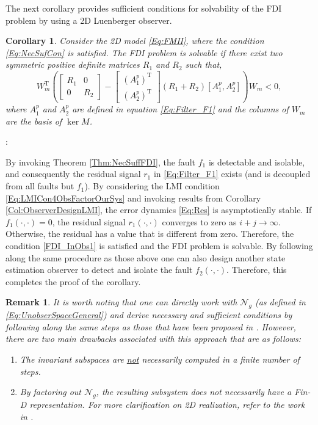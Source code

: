 \documentclass[journal,12pt,draftcls,onecolumn]{IEEEtran}
\newcommand{\tran}{\mathrm{T}}
\newcommand{\bbm}{\begin{bmatrix}}
\newcommand{\ebm}{\end{bmatrix}}
\newcommand{\ssp}[1]{\mathscr{#1}}      \newcommand{\setssp}[1]{\mathfrak{#1}}   \newcommand{\fld}[1]{\mathbb{#1}}       \newcommand{\op}[1]{\mathcal{#1}}       \newcommand{\sumbanach}[1]{\sum{#1}}
\def\QEDclosed{\hfill\IEEEQEDclosed}
\renewcommand{\qed}{\QEDclosed}
\renewenvironment{proof}[1][\proofname]{\noindent\nobreakspace{\bfseries #1}:\;}{\qed\par}
\newtheorem{corollary}{Corollary}
\newtheorem{remark}{Remark}
\begin{document}
The next corollary provides sufficient conditions for solvability of the FDI problem by using a 2D Luenberger observer.
\begin{corollary}\label{Col:FDI_LMI_Suff}
	Consider  the 2D model \eqref{Eq:FMII}, where the condition \eqref{Eq:NecSufCon} is satisfied. The FDI problem is solvable if there exist two symmetric  positive definite matrices $R_1$ and $R_2$ such that,
	\begin{equation}\label{Eq:LMICon4ObsFactorOurSys}
		W_m^\tran (\bbm R_1 &0\\ 0 &R_2\ebm - \bbm (A_1^p)^\tran\\(A_2^p)^\tran\ebm (R_1+R_2)[A_1^p,A_2^p])W_m<0,
	\end{equation}
	where $A_1^p$ and $A_2^p$ are defined in equation \eqref{Eq:Filter_F1} and the columns of $W_m$ are the basis of $\ker M$.
\end{corollary}
\begin{proof}
	
	By invoking Theorem \ref{Thm:NecSuffFDI}, the fault $f_1$ is detectable and isolable, and consequently the residual signal $r_1$ in \eqref{Eq:Filter_F1} exists (and is decoupled from all faults but $f_1$). By considering the LMI condition \eqref{Eq:LMICon4ObsFactorOurSys} and invoking results from Corollary \ref{Col:ObserverDesignLMI}, the error dynamics \eqref{Eq:Res} is asymptotically stable. If $f_1(\cdot,\cdot)=0$, the residual signal $r_1(\cdot,\cdot)$ converges to zero as $i+j\rightarrow\infty$. Otherwise, the residual has a value that is different from zero. Therefore, the condition \eqref{FDI_InObs1} is satisfied and the FDI problem is solvable. By following along the same procedure as those above one can also design another state estimation observer to detect and isolate the fault $f_2(\cdot,\cdot)$. Therefore, this completes the proof of the corollary.
\end{proof}
\begin{remark}\label{Rem:InfFactor}
	It is worth noting that one can directly work with $\ssp{N}_g$ (as defined in \eqref{Eq:UnobserSpaceGeneral}) and derive necessary and sufficient conditions by following along the same steps as those that have been proposed in \cite{ECC2014}. However, there are two main drawbacks associated with this approach that are as follows:
	\begin{enumerate}
		\item The invariant subspaces are \underline{not} necessarily computed in a finite number of steps.
		\item By factoring out $\ssp{N}_g$, the resulting subsystem does not  necessarily have a Fin-D representation. For more clarification on 2D realization, refer to the work in \cite{FMMinimalRealization}.
	\end{enumerate}
\end{remark}
\end{document}
